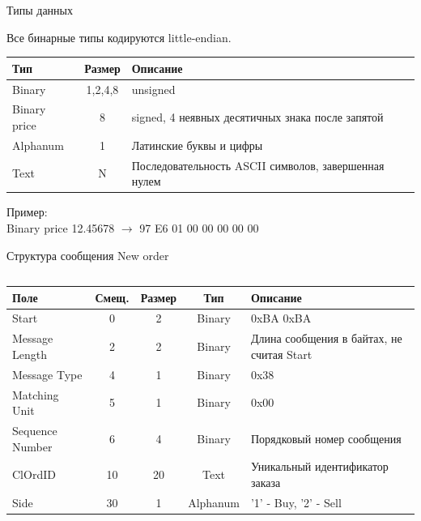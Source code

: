 \documentclass[unknownkeysallowed,xcolor=table]{beamer}
\newcommand{\rarr}{$\rightarrow$}
\begin{document}
\begin{frame}{Типы данных}

Все бинарные типы кодируются little-endian.

\vspace{1em}

\begin{center}
\begin{tabular}{ |l|c|m{18em}| }
  \hline
    Тип & Размер & Описание \\
  \hline
    Binary & 1,2,4,8 & unsigned \\
    Binary price & 8 & signed, 4 неявных десятичных знака после запятой \\
    Alphanum & 1 & Латинские буквы и цифры \\
    Text & N & Последовательность ASCII символов, завершенная нулем \\
  \hline
\end{tabular}
\end{center}

Пример: \\
Binary price\hspace{1em} 12.45678 \rarr\hspace{1em} 97 E6 01 00 00 00 00 00 \\

\end{frame}

\begin{frame}{Структура сообщения New order}

\begin{columns}
\column{\dimexpr\paperwidth-10pt}
\begin{center}
\begin{tabular}{ |m{5em}|c c c |m{10em}| }
  \hline
    Поле & Смещ. & Размер & Тип & Описание \\
  \hline
    Start & 0 & 2 & Binary & 0xBA 0xBA \\[4pt]
    Message Length & 2 & 2 & Binary & Длина сообщения в байтах, не считая Start \\[4pt]
    Message Type & 4 & 1 & Binary & 0x38 \\[4pt]
    Matching Unit & 5 & 1 & Binary & 0x00 \\[4pt]
    Sequence Number & 6 & 4 & Binary & Порядковый номер сообщения \\[4pt]
    ClOrdID & 10 & 20 & Text & Уникальный идентификатор заказа \\[4pt]
    Side & 30 & 1 & Alphanum & '1' - Buy, '2' - Sell \\[4pt]
  \hline
\end{tabular}
\end{center}
\end{columns}

\end{frame}
\end{document}
